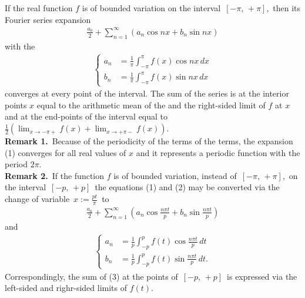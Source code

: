 \documentclass[12pt]{article}
\theoremstyle{definition}
\begin{document}

If the real function $f$ is of bounded variation on the interval \,$[-\pi,\,+\pi]$,\, then its Fourier series expansion
\begin{align}
\frac{a_0}{2}+\sum_{n=1}^\infty(a_n\cos{nx}+b_n\sin{nx})
\end{align}
with the 
\begin{align}
\begin{cases}
a_n &= \frac{1}{\pi}\int_{-\pi}^{\pi} f(x)\cos{nx}\,dx\\
b_n &= \frac{1}{\pi}\int_{-\pi}^{\pi} f(x)\sin{nx}\,dx
\end{cases}
\end{align}
converges at every point of the interval. The sum of the series is at the interior points $x$ equal to the arithmetic mean of the  and the right-sided limit of $f$ at $x$ and at the end-points of the interval equal to\,
$\displaystyle\frac{1}{2}\left(\lim_{x\to-\pi+}f(x)+\lim_{x\to+\pi-}f(x)\right)$.\\

\textbf{Remark 1.}\, Because of the periodicity of the terms of the terms, the expansion (1) converges for all real values of $x$ and it represents a periodic function with the period $2\pi$.\\

\textbf{Remark 2.}\, If the function $f$ is of bounded variation, instead of\, $[-\pi,\,+\pi]$,\, on the interval 
\,$[-p,\,+p]$\, the equations (1) and (2) may be converted via the change of variable 
\,$\displaystyle x := \frac{pt}{\pi}$\, to
\begin{align}
\frac{a_0}{2}+\sum_{n=1}^\infty(a_n\cos\frac{n\pi t}{p}+b_n\sin\frac{n\pi t}{p})
\end{align}
and
\begin{align}
\begin{cases}
a_n &= \frac{1}{p}\int_{-p}^p f(t)\cos\frac{n\pi t}{p}\,dt\\
b_n &= \frac{1}{p}\int_{-p}^p f(t)\sin\frac{n\pi t}{p}\,dt.
\end{cases}
\end{align}
Correspondingly, the sum of (3) at the points of\, $[-p,\,+p]$\, is expressed via the left-sided and righr-sided limits of $f(t)$.



\end{document}
